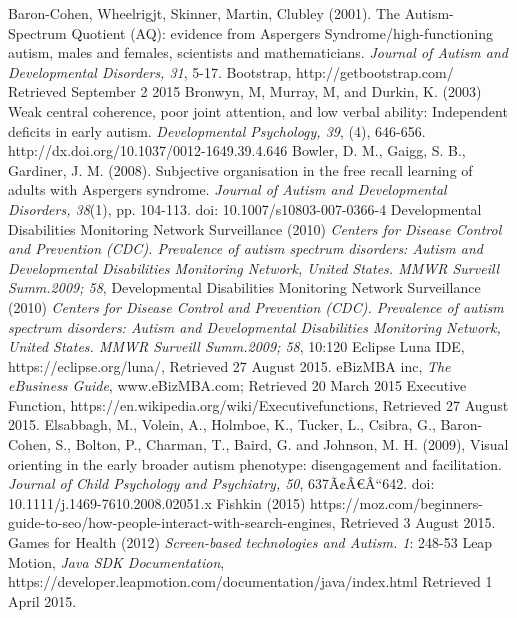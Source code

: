 \documentclass[a4paper, 11pt]{article}
\begin{document}
\clearpage
\begin{thebibliography}{100}

 Baron-Cohen, Wheelrigjt, Skinner, Martin, Clubley (2001).  The Autism-Spectrum Quotient (AQ): evidence from Aspergers Syndrome/high-functioning autism, males and females, scientists and mathematicians.  \textit{Journal of Autism and Developmental Disorders, 31}, 5-17.
Bootstrap, http://getbootstrap.com/ Retrieved September 2 2015
 Bronwyn, M, Murray, M, and Durkin, K. (2003) Weak central coherence, poor joint attention, and low verbal ability: Independent deficits in early autism. \textit{Developmental Psychology, 39}, (4), 646-656. http://dx.doi.org/10.1037/0012-1649.39.4.646
 Bowler, D. M., Gaigg, S. B., Gardiner, J. M. (2008). Subjective organisation in the free recall learning of adults with Aspergers syndrome. \textit{Journal of Autism and Developmental Disorders, 38}(1), pp. 104-113. doi: 10.1007/s10803-007-0366-4 
Developmental Disabilities Monitoring Network Surveillance (2010) \textit{Centers for Disease Control and Prevention (CDC). Prevalence of autism spectrum disorders: Autism and Developmental Disabilities Monitoring Network, United States. MMWR Surveill Summ.2009; 58},
Developmental Disabilities Monitoring Network Surveillance (2010) \textit{Centers for Disease Control and Prevention (CDC). Prevalence of autism spectrum disorders: Autism and Developmental Disabilities Monitoring Network, United States. MMWR Surveill Summ.2009; 58}, 10:120
 Eclipse Luna IDE, https://eclipse.org/luna/, Retrieved 27 August 2015.
eBizMBA inc, \textit{The eBusiness Guide}, www.eBizMBA.com; Retrieved 20 March 2015
 Executive Function, https://en.wikipedia.org/wiki/Executivefunctions, Retrieved 27 August 2015.
Elsabbagh, M., Volein, A., Holmboe, K., Tucker, L., Csibra, G., Baron-Cohen, S., Bolton, P., Charman, T., Baird, G. and Johnson, M. H. (2009), Visual orienting in the early broader autism phenotype: disengagement and facilitation. \textit{Journal of Child Psychology and Psychiatry, 50}, 637Ã¢Â€Â“642. doi: 10.1111/j.1469-7610.2008.02051.x
 Fishkin (2015) https://moz.com/beginners-guide-to-seo/how-people-interact-with-search-engines, Retrieved 3 August 2015.
 Games for Health (2012) \textit{Screen-based technologies and Autism. 1}: 248-53
 Leap Motion, \textit{Java SDK Documentation}, \\https://developer.leapmotion.com/documentation/java/index.html Retrieved 1 April 2015.

\end{thebibliography}
\end{document}
